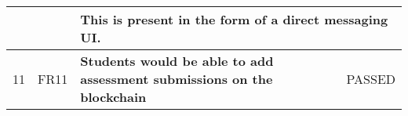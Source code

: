 \begin{table}[!ht]
\begin{tabularx}{\textwidth}{|c|c|X|c|}
		\hline
		                                                                  &                         & \multicolumn{2}{X|}{This is present in the form of a direct messaging UI.}                                                                                                      \\
		\hline
		11                                                                & FR11                    & \textbf{Students would be able to add assessment submissions
		on the blockchain}                                                & \cellcolor{green}PASSED                                                                                                                                                                                   \\
		\hline
	\end{tabularx}
\end{table}
\clearpage
